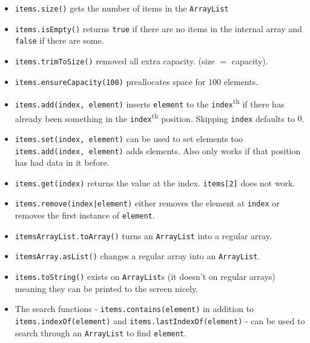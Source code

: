 \begin{itemize}
	\item \texttt{items.size()} gets the number of items in the \texttt{ArrayList}
	\item \texttt{items.isEmpty()} returns \texttt{true} if there are no items in the internal array and \texttt{false} if there are some.
	\item \texttt{items.trimToSize()} removed all extra capacity. (size \(=\) capacity).
	\item \texttt{items.ensureCapacity(100)} preallocates space for \(100\) elements.
	\item \texttt{items.add(index, element)} inserts \texttt{element} to the \texttt{index}\textsuperscript{th} if there has already been something in the \texttt{index}\textsuperscript{th} position. Skipping \texttt{index} defaults to \(0\).
	\item \texttt{items.set(index, element)} can be used to set elements too \texttt{items.add(index, element)} adds elements. Also only works if that position has had data in it before.
	\item \texttt{items.get(index)} returns the value at the index. \texttt{items[2]} does not work.
	\item \texttt{items.remove(index|element)} either removes the element at \texttt{index} or removes the first instance of \texttt{element}.
	\item \texttt{itemsArrayList.toArray()} turns an \texttt{ArrayList} into a regular array.
	\item \texttt{itemsArray.asList()} changes a regular array into an \texttt{ArrayList}.
	\item \texttt{items.toString()} exists on \texttt{ArrayList}s (it doesn't on regular arrays) meaning they can be printed to the screen nicely.
	\item The search functions - \texttt{items.contains(element)} in addition to \texttt{items.indexOf(element)} and \texttt{items.lastIndexOf(element)} - can be used to search through an \texttt{ArrayList} to find \texttt{element}.
\end{itemize}
